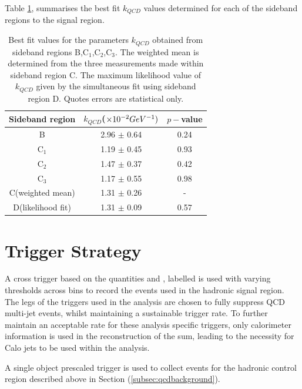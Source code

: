 Table \ref{tab:kqcdresults}, summarises the best fit $k_{QCD}$ values determined for each of the sideband regions to the signal region.

\begin{table}[h!]
\footnotesize
\begin{center}
\begin{tabular*}{0.6\textwidth}{@{\extracolsep{\fill}}ccc}
\hline
Sideband region & $k_{QCD}$($\times 10^{-2} GeV^{-1})$ & $p-$value\\ 
\hline\hline
B & 2.96 $\pm$ 0.64 & 0.24 \\
C$_{1}$ & 1.19 $\pm$ 0.45 & 0.93 \\
C$_{2}$ & 1.47 $\pm$ 0.37 & 0.42 \\
C$_{3}$ & 1.17 $\pm$ 0.55 & 0.98 \\
\cline{1-3}
C(weighted mean) & 1.31 $\pm$ 0.26 & - \\
D(likelihood fit) & 1.31 $\pm$ 0.09 & 0.57 \\
\end{tabular*}
\end{center}
\caption[Best fit values for the parameters $k_{QCD}$ obtained from sideband regions B,C$_{1}$,C$_{2}$,C$_{3}$. ]{Best fit values for the parameters $k_{QCD}$ obtained from sideband regions B,C$_{1}$,C$_{2}$,C$_{3}$. The weighted mean is determined from the three measurements made within sideband region C. The maximum likelihood value of $k_{QCD}$ given by the simultaneous fit using sideband region D. Quotes errors are statistical only. }
\label{tab:kqcdresults}
\end{table}


\section{Trigger Strategy}
\label{subsec:triggerstrategy}

A cross trigger based on the quantities \theht and \alphat, labelled is used with varying thresholds across \theht bins to record the events used in the hadronic signal region. The \alphat legs of the \htalphat triggers used in the analysis are chosen to fully suppress QCD multi-jet events, whilst maintaining a sustainable trigger rate. To further maintain an acceptable rate for these analysis specific triggers, only calorimeter information is used in the reconstruction of the \theht sum, leading to the necessity for Calo jets to be used within the analysis. 

A single object prescaled \theht trigger is used to collect events for the hadronic control region described above in Section (\ref{subsec:qcdbackground}).

